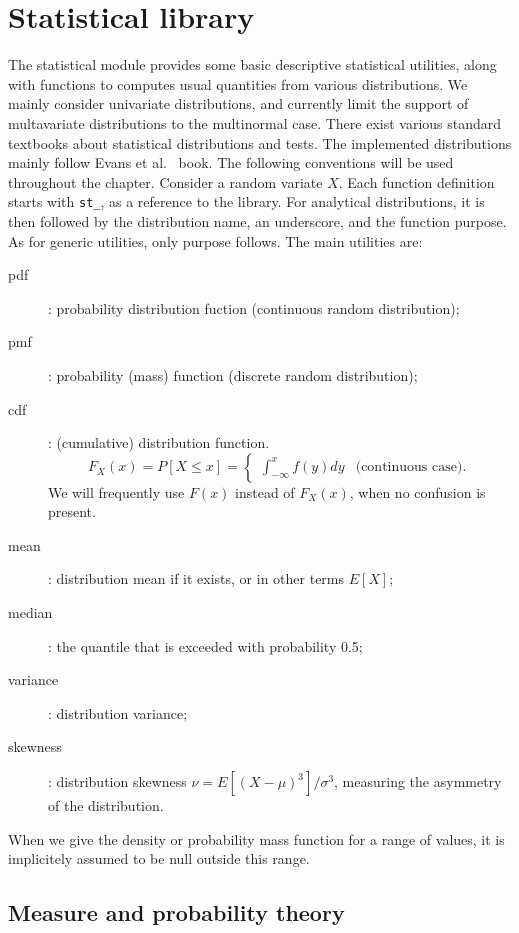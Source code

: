 \chapter{Statistical library}

The statistical module provides some basic descriptive statistical utilities, along with functions to computes usual quantities from various distributions. We mainly consider univariate distributions, and currently limit the support of multavariate distributions to the multinormal case.
There exist various standard textbooks about statistical distributions and tests.
The implemented distributions mainly follow Evans et al.~\cite{EvanHastPeac93} book.
The following conventions will be used throughout the chapter.
Consider a random variate $X$. Each function definition starts with \verb|st_|, as a reference to the library.
For analytical distributions, it is then followed by the distribution
name, an underscore, and the function purpose.
As for generic utilities, only purpose follows.
The main utilities are:
\begin{description}
\item[pdf]: probability distribution fuction (continuous random distribution);
\item[pmf]: probability (mass) function (discrete random distribution);
\item[cdf]: (cumulative) distribution function.
\[
 {F_X(x)} = P[X\le x] = \begin{cases}
  \int_{-\infty}^x f(y)dy & \text{(continuous case)}.
 \end{cases}
\]
We will frequently use $F(x)$ instead of $F_X(x)$, when no confusion
is present.
\item[mean]: distribution mean if it exists, or in other terms $E[X]$;
\item[median]: the quantile that is exceeded with probability 0.5;
\item[variance]: distribution variance;
\item[skewness]: distribution skewness $\nu = E[(X-\mu)^3]/\sigma^3$, measuring the asymmetry of the distribution.
\end{description}
When we give the density or probability mass function for a range of
values, it is implicitely assumed to be null outside this range.

\section{Measure and probability theory}

